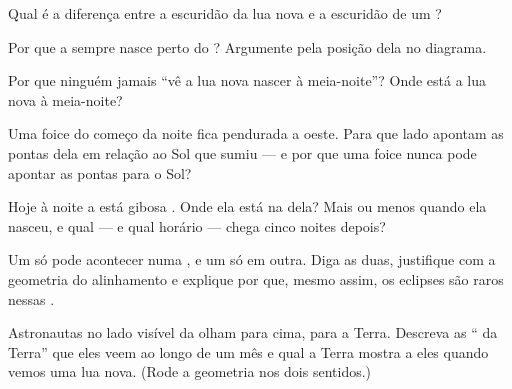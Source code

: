 \begin{exercise}[$\star$]\label{exo:g7:moon-phases:5}
Qual é a diferença entre a escuridão da lua nova e a escuridão de um
?
\end{exercise}

\begin{exercise}[$\star$]\label{exo:g7:moon-phases:6}
Por que a  sempre nasce perto do ? Argumente pela
posição dela no diagrama.
\end{exercise}

\begin{exercise}[$\star$]\label{exo:g7:moon-phases:7}
Por que ninguém jamais ``vê a lua nova nascer à meia-noite''? Onde
está a lua nova à meia-noite?
\end{exercise}

\begin{exercise}[$\star$]\label{exo:g7:moon-phases:8}
Uma foice do começo da noite fica pendurada a oeste. Para que lado
apontam as pontas dela em relação ao Sol que sumiu --- e por que uma
foice nunca pode apontar as pontas para o Sol?
\end{exercise}

\begin{exercise}[$\star\star$]\label{exo:g7:moon-phases:9}
Hoje à noite a  está gibosa . Onde ela está na 
dela? Mais ou menos quando ela nasceu, e qual  --- e qual horário
--- chega cinco noites depois?
\end{exercise}

\begin{exercise}[$\star\star$]\label{exo:g7:moon-phases:10}
Um  só pode acontecer numa , e um  só
em outra. Diga as duas, justifique com a geometria do alinhamento e
explique por que, mesmo assim, os eclipses são raros nessas .
\end{exercise}

\begin{exercise}[$\star\star$]\label{exo:g7:moon-phases:11}
Astronautas no lado visível da  olham para cima, para a Terra.
Descreva as `` da Terra'' que eles veem ao longo de um mês e qual
 a Terra mostra a eles quando vemos uma lua nova. (Rode a
geometria nos dois sentidos.)
\end{exercise}

